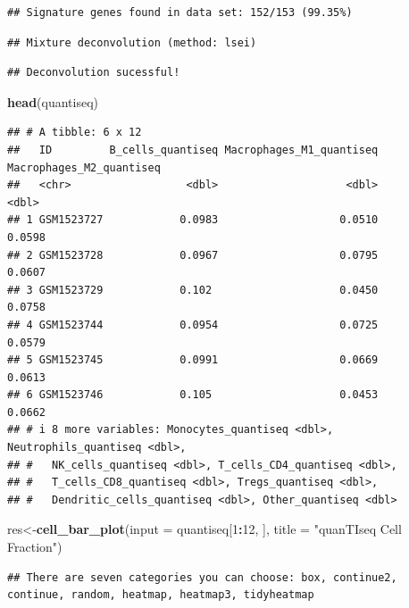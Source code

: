 \documentclass[
  12pt,
]{book}
\newenvironment{Shaded}{\begin{snugshade}}{\end{snugshade}}
\newcommand{\AttributeTok}[1]{\textcolor[rgb]{0.13,0.29,0.53}{#1}}
\newcommand{\DecValTok}[1]{\textcolor[rgb]{0.00,0.00,0.81}{#1}}
\newcommand{\FunctionTok}[1]{\textcolor[rgb]{0.13,0.29,0.53}{\textbf{#1}}}
\newcommand{\NormalTok}[1]{#1}
\newcommand{\OtherTok}[1]{\textcolor[rgb]{0.56,0.35,0.01}{#1}}
\newcommand{\SpecialCharTok}[1]{\textcolor[rgb]{0.81,0.36,0.00}{\textbf{#1}}}
\newcommand{\StringTok}[1]{\textcolor[rgb]{0.31,0.60,0.02}{#1}}
\theoremstyle{definition}
\theoremstyle{definition}
\theoremstyle{definition}
\theoremstyle{definition}
\theoremstyle{remark}
\begin{document}
\begin{verbatim}
## Signature genes found in data set: 152/153 (99.35%)
\end{verbatim}

\begin{verbatim}
## Mixture deconvolution (method: lsei)
\end{verbatim}

\begin{verbatim}
## Deconvolution sucessful!
\end{verbatim}

\begin{Shaded}
\begin{Highlighting}[]
\FunctionTok{head}\NormalTok{(quantiseq)}
\end{Highlighting}
\end{Shaded}

\begin{verbatim}
## # A tibble: 6 x 12
##   ID         B_cells_quantiseq Macrophages_M1_quantiseq Macrophages_M2_quantiseq
##   <chr>                  <dbl>                    <dbl>                    <dbl>
## 1 GSM1523727            0.0983                   0.0510                   0.0598
## 2 GSM1523728            0.0967                   0.0795                   0.0607
## 3 GSM1523729            0.102                    0.0450                   0.0758
## 4 GSM1523744            0.0954                   0.0725                   0.0579
## 5 GSM1523745            0.0991                   0.0669                   0.0613
## 6 GSM1523746            0.105                    0.0453                   0.0662
## # i 8 more variables: Monocytes_quantiseq <dbl>, Neutrophils_quantiseq <dbl>,
## #   NK_cells_quantiseq <dbl>, T_cells_CD4_quantiseq <dbl>,
## #   T_cells_CD8_quantiseq <dbl>, Tregs_quantiseq <dbl>,
## #   Dendritic_cells_quantiseq <dbl>, Other_quantiseq <dbl>
\end{verbatim}

\begin{Shaded}
\begin{Highlighting}[]
\NormalTok{res}\OtherTok{\textless{}{-}}\FunctionTok{cell\_bar\_plot}\NormalTok{(}\AttributeTok{input =}\NormalTok{ quantiseq[}\DecValTok{1}\SpecialCharTok{:}\DecValTok{12}\NormalTok{, ], }\AttributeTok{title =} \StringTok{"quanTIseq Cell Fraction"}\NormalTok{)}
\end{Highlighting}
\end{Shaded}

\begin{verbatim}
## There are seven categories you can choose: box, continue2, continue, random, heatmap, heatmap3, tidyheatmap
\end{verbatim}
\end{document}
